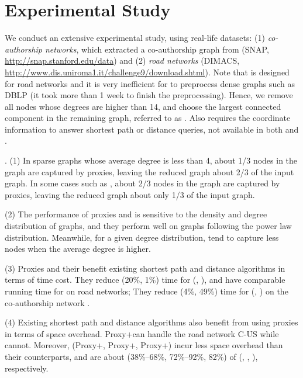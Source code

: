 \section{Experimental Study}
\label{sec-expt}


We conduct an extensive experimental study, using real-life datasets:
%
(1) {\em co-authorship networks}, which extracted a co-authorship graph from \dblp (SNAP, \url{http://snap.stanford.edu/data})
 and (2) {\em road networks} (DIMACS, \url{http://www.dis.uniroma1.it/challenge9/download.shtml}).
Note that \tnr is designed for road networks and it is very inefficient for \tnr to preprocess dense graphs such as DBLP (it took more than 1 week to finish the preprocessing). Hence, we remove all nodes whose degrees are higher than 14, and choose the largest connected component in the remaining graph, referred to as \dblpone. Also \ah requires the coordinate information to answer shortest path or distance queries, not available in both \dblp and \dblpone.

.
(1) In sparse graphs whose average degree is less than 4, about 1/3 nodes in the graph are captured by proxies, leaving the reduced graph about 2/3 of the input graph. In some cases such as \dblpone, about 2/3 nodes in the graph are captured by proxies, leaving the reduced graph about only 1/3 of the input graph.

\sstab(2) The performance of proxies and \dras is sensitive to the density and degree distribution of graphs, and they perform well on graphs following the power law distribution. Meanwhile, for a given degree distribution, \dras tend to capture less nodes when the average degree is higher.

\sstab(3) Proxies and their \dras benefit existing shortest path and distance algorithms in terms of time cost. They reduce (20\%, 1\%) time for (\arcflag, \ah), and have comparable running time for \tnr on road networks; They reduce (4\%, 49\%) time for (\arcflag, \tnr) on the co-authorship network \dblpone.

\sstab(4) Existing shortest path and distance algorithms also benefit from using proxies in terms of space overhead. Proxy+\tnr can handle the road network C-US while \tnr cannot. Moreover, (Proxy+\arcflag, Proxy+\tnr, Proxy+\ah) incur less space overhead than their counterparts, and are about (38\%--68\%, 72\%--92\%, 82\%) of (\arcflag, \tnr, \ah), respectively.

